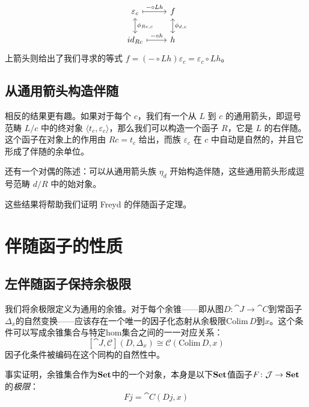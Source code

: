 \documentclass[DaoFP]{subfiles}
\begin{document}
\[
 \begin{tikzcd}
\varepsilon_c
 \arrow[d, leftrightarrow, "\phi_{R c, c}"]
 \arrow[r, maps to, "- \circ L h"]
 &
f
  \arrow[d, leftrightarrow, "\phi_{d, c}"]
 \\
id_{R c}
 \arrow[r, maps to, "- \circ h"]
& h
 \end{tikzcd}
\]
上箭头则给出了我们寻求的等式 $f = (- \circ L h) \varepsilon_c = \varepsilon_c \circ L h$。

\subsection{从通用箭头构造伴随}

相反的结果更有趣。如果对于每个 $c$，我们有一个从 $L$ 到 $c$ 的通用箭头，即逗号范畴 $L/c$ 中的终对象 $\langle t_c, \varepsilon_c \rangle$，那么我们可以构造一个函子 $R$，它是 $L$ 的右伴随。这个函子在对象上的作用由 $R c = t_c$ 给出，而族 $\varepsilon_c$ 在 $c$ 中自动是自然的，并且它形成了伴随的余单位。

还有一个对偶的陈述：可以从通用箭头族 $\eta_d$ 开始构造伴随，这些通用箭头形成逗号范畴 $d/R$ 中的始对象。

这些结果将帮助我们证明 Freyd 的伴随函子定理。

\section{伴随函子的性质}

\subsection{左伴随函子保持余极限}

我们将余极限定义为通用的余锥。对于每个余锥——即从图$D \colon \cat J \to \cat C$到常函子$\Delta_x$的自然变换——应该存在一个唯一的因子化态射从余极限$\text{Colim}\, D$到$x$。这个条件可以写成余锥集合与特定hom集合之间的一一对应关系：
\[ [\cat J, \mathcal{C}](D, \Delta_x)  \cong \mathcal{C}( \text{Colim} \, D, x) \]
因子化条件被编码在这个同构的自然性中。

事实证明，余锥集合作为$\mathbf{Set}$中的一个对象，本身是以下$\mathbf{Set}$值函子$F \colon \mathcal{J} \to \mathbf{Set}$的\emph{极限}：
\[ F j = \cat C(D j, x) \]
\end{document}
